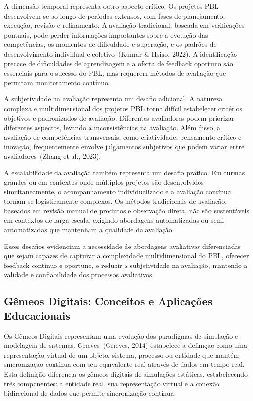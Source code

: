 \documentclass[english, spanish, brazilian]{modelo_dt}
\begin{document}
A dimensão temporal representa outro aspecto crítico. Os projetos PBL
desenvolvem-se ao longo de períodos extensos, com fases de planejamento,
execução, revisão e refinamento. A avaliação tradicional, baseada em
verificações pontuais, pode perder informações importantes sobre a evolução das
competências, os momentos de dificuldade e superação, e os padrões de
desenvolvimento individual e coletivo~(Kumar \& Hsiao, 2022). A identificação
precoce de dificuldades de aprendizagem e a oferta de feedback oportuno são
essenciais para o sucesso do PBL, mas requerem métodos de avaliação que
permitam monitoramento contínuo.

A subjetividade na avaliação representa um desafio adicional. A natureza
complexa e multidimensional dos projetos PBL torna difícil estabelecer
critérios objetivos e padronizados de avaliação. Diferentes avaliadores podem
priorizar diferentes aspectos, levando a inconsistências na avaliação. Além
disso, a avaliação de competências transversais, como criatividade, pensamento
crítico e inovação, frequentemente envolve julgamentos subjetivos que podem
variar entre avaliadores~(Zhang et al., 2023).

A escalabilidade da avaliação também representa um desafio prático. Em turmas
grandes ou em contextos onde múltiplos projetos são desenvolvidos
simultaneamente, o acompanhamento individualizado e a avaliação contínua
tornam-se logisticamente complexos. Os métodos tradicionais de avaliação,
baseados em revisão manual de produtos e observação direta, não são
sustentáveis em contextos de larga escala, exigindo abordagens automatizadas ou
semi-automatizadas que mantenham a qualidade da avaliação.

Esses desafios evidenciam a necessidade de abordagens avaliativas diferenciadas
que sejam capazes de capturar a complexidade multidimensional do PBL, oferecer
feedback contínuo e oportuno, e reduzir a subjetividade na avaliação, mantendo
a validade e confiabilidade dos processos avaliativos.

\subsection{Gêmeos Digitais: Conceitos e Aplicações Educacionais}

Os Gêmeos Digitais representam uma evolução dos paradigmas de simulação e
modelagem de sistemas\@. Grieves\@~(Grieves, 2014) estabelece a definição como
uma representação virtual de um objeto, sistema, processo ou entidade que
mantém sincronização contínua com seu equivalente real através de dados em
tempo real\@. Esta definição diferencia os gêmeos digitais de simulações
estáticas, estabelecendo três componentes: a entidade real, sua representação
virtual e a conexão bidirecional de dados que permite sincronização contínua\@.
\end{document}
